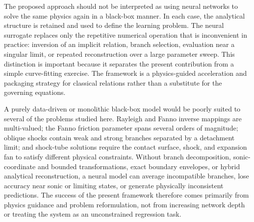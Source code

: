 \documentclass[preprint,12pt]{elsarticle}
\newcommand{\rev}[1]{#1}
\newcommand{\rev}[1]{\textcolor{revisionblue}{#1}}
\begin{document}
The proposed approach should not be interpreted as using neural networks to solve the same physics again in a black-box manner. In each case, the analytical structure is retained and used to define the learning problem. The neural surrogate replaces only the repetitive numerical operation that is inconvenient in practice: inversion of an implicit relation, branch selection, evaluation near a singular limit, or repeated reconstruction over a large parameter sweep. This distinction is important because it separates the present contribution from a simple curve-fitting exercise. The framework is a physics-guided acceleration and packaging strategy for classical relations rather than a substitute for the governing equations.

A purely data-driven or monolithic black-box model would be poorly suited to several of the problems studied here. Rayleigh and Fanno inverse mappings are multi-valued; the Fanno friction parameter spans several orders of magnitude; oblique shocks contain weak and strong branches separated by a detachment limit; and shock-tube solutions require the contact surface, shock, and expansion fan to satisfy different physical constraints. Without branch decomposition, \rev{sonic-coordinate and bounded transformations, exact boundary envelopes}, or hybrid analytical reconstruction, a neural model can average incompatible branches, lose accuracy near sonic or limiting states, or generate physically inconsistent predictions. The success of the present framework therefore comes primarily from physics guidance and problem reformulation, not from increasing network depth or treating the system as an unconstrained regression task.
\end{document}
